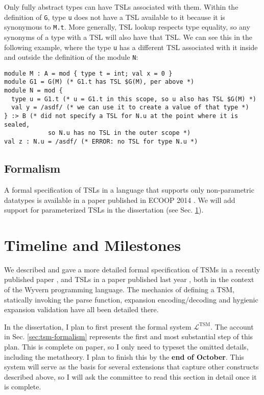 Only fully abstract types can have TSLs associated with them. Within the definition of \lstinline{G}, type \lstinline{u} does not have a TSL available to it because it is synonymous to \lstinline{M.t}. More generally, TSL lookup respects type equality, so any synonyms of a type with a TSL will also have that TSL. We can see this in the following example, where the type \lstinline{u} has a different TSL associated with it inside and outside the definition of the module \lstinline{N}:
\begin{lstlisting}[numbers=none,mathescape=|]
module M : A = mod { type t = int; val x = 0 }
module G1 = G(M) (* G1.t has TSL $G(M), per above *)
module N = mod { 
  type u = G1.t (* u = G1.t in this scope, so u also has TSL $G(M) *)
  val y = /asdf/ (* we can use it to create a value of that type *) 
} :> B (* did not specify a TSL for N.u at the point where it is sealed, 
            so N.u has no TSL in the outer scope *)
val z : N.u = /asdf/ (* ERROR: no TSL for type N.u *)
\end{lstlisting}

\subsection{Formalism}
A formal specification of TSLs in a language that supports only non-parametric datatypes is available in a paper published in ECOOP 2014 \cite{TSLs}. We will add support for parameterized TSLs in the dissertation (see Sec. \ref{sec:syntax-timeline}).



\section{Timeline and Milestones}\label{sec:syntax-timeline}
We described and gave a more detailed formal specification of TSMs in a recently published paper \cite{sac15}, and TSLs in a paper published last year \cite{TSLs}, both in the context of the Wyvern programming language. The mechanics of defining a TSM, statically invoking the parse function, expansion encoding/decoding and hygienic expansion validation have all been detailed there. 

In the dissertation, I plan to first present the formal system $\mathcal{L}^\text{TSM}$. The account in Sec. \ref{sec:tsm-formalism} represents the first and most substantial step of this plan. This is complete on paper, so I only need to typeset the omitted details, including the metatheory. I plan to finish this by the \textbf{end of October}. This system will serve as the basis for several extensions that capture other constructs described above, so I will ask the committee to read this section in detail once it is complete.

